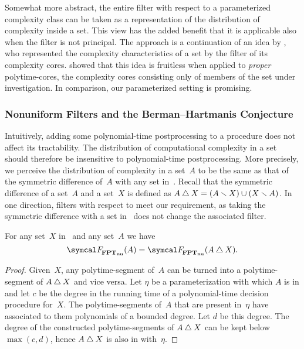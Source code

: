Somewhat more abstract, the entire filter with respect to a parameterized complexity class can be taken as a representation of the distribution of complexity inside a set.
This view has the added benefit that it is applicable also when the filter is not principal.
The approach is a continuation of an idea by \textcite{orponen1986classification}, who represented the complexity characteristics of a set by the filter of its complexity cores.
 showed that this idea is fruitless when applied to \emph{proper} polytime-cores, the complexity cores consisting only of members of the set under investigation.
In comparison, our parameterized setting is promising.

\subsubsection{Nonuniform Filters and the Berman--Hartmanis Conjecture}
Intuitively, adding some polynomial-time postprocessing to a procedure does not affect its tractability.
The distribution of computational complexity in a set should therefore be insensitive to polynomial-time postprocessing.
More precisely, we perceive the distribution of complexity in a set~$A$ to be the same as that of the symmetric difference of~$A$ with any set in~.
Recall that the symmetric difference of a set~$A$ and a set~$X$ is defined as $A \bigtriangleup X = (A \smallsetminus X) \cup (X \smallsetminus A)$.
In one direction, filters with respect to  meet our requirement, as taking the symmetric difference with a set in~ does not change the associated filter.
\begin{theorem}
\label{thm:nufptsymdiffeq}%
  For any set~$X$ in~ and any set~$A$ we have
  \begin{equation*}
    \calF_\clnu{FPT}(A) = \calF_\clnu{FPT}(A \symdiff X).
  \end{equation*}
\end{theorem}
\begin{proof}
  Given~$X$, any polytime-segment of~$A$ can be turned into a polytime-segment of $A \bigtriangleup X$ and vice versa.
  Let $\eta$ be a parameterization with which $A$ is in  and let $c$ be the degree in the running time of a polynomial-time decision procedure for~$X$.
  The polytime-segments of~$A$ that are present in~$\eta$ have associated to them polynomials of a bounded degree.
  Let $d$ be this degree.
  The degree of the constructed polytime-segments of $A \bigtriangleup X$ can be kept below $\max(c, d)$, hence $A \bigtriangleup X$ is also in  with~$\eta$.
\end{proof}


